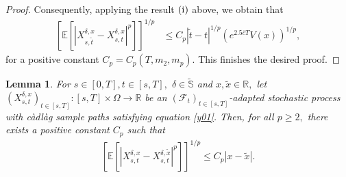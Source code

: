 \documentclass[11pt]{article}
\theoremstyle{theorem}
\newtheorem{Lem}[Def]{Lemma}
\theoremstyle{definition}
\newcommand{\bR}{\mathbb{R}}
\newcommand{\mf}{\mathcal{F}}
\newcommand{\1}{{\bf 1}}
\begin{document}
\begin{proof}
Consequently, applying the result $\textup{(i)}$ above, we obtain that
\begin{align}
\label{Lem3.3.4}
\left[\mathbb{E}\left[\left|X^{\delta, x}_{s,\widetilde{t}}-X^{\delta, x}_{s,t}\right|^p\right]\right]^{1/p} 
&\leq C_p |\widetilde{t} -t|^{1/p} (e^{2.5 \overline{c}T}V(x))^{1/p},
\end{align} 
for a positive constant $C_p=C_p(T,m_2,m_p)$. This finishes the desired proof. 
\end{proof}

\begin{Lem}
\label{Lem3.4}
 For $s\in [0, T], t \in [s, T],$ $\delta \in \widetilde{\mathbb{S}}$ and $ x, \widetilde{x} \in \bR,$ let $(X^{\delta,x}_{s,t})_{t\in[s,T]}:[s,T]  \times\Omega\to\mathbb{R} $ 
be an $(\mf_t)_{t\in[s,T]}$-adapted stochastic process with c\`adl\`ag  sample paths satisfying equation \eqref{y01}. Then, for all $p\ge 2,$ there exists a positive constant $C_p$ such that \begin{align*}
\left[\mathbb{E}\left[\left|X^{\delta, x}_{s,t}-X^{\delta, \widetilde{x}}_{s,t}\right|^p\right]\right]^{1/p} \leq C_p |x-\widetilde{x}|.  
\end{align*}
\end{Lem}
\end{document}
